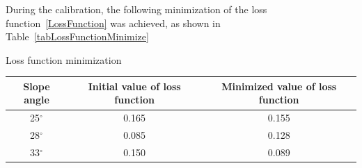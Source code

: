 \documentclass[sensors,article,submit,moreauthors,pdftex]{Definitions/mdpi}
\begin{document}
\begin{paracol}{2}
\linenumbers
\switchcolumn

During the calibration, the following minimization of the loss function~\eqref{LossFunction} was achieved, as shown in Table~\ref{tabLossFunctionMinimize}

\begin{specialtable}[H] 
    \caption{Loss function minimization\label{tabLossFunctionMinimize}}
    \begin{tabular}{  c  c  c  }
    \toprule
    \textbf{Slope angle} & \textbf{Initial value of loss function} & \textbf{Minimized value of loss function}\\
    \midrule
    25$^\circ$ & 0.165 & 0.155\\
    28$^\circ$ & 0.085 & 0.128\\
    33$^\circ$ & 0.150 & 0.089\\
    \bottomrule
    \end{tabular}
\end{specialtable}


\end{paracol}
\end{document}
